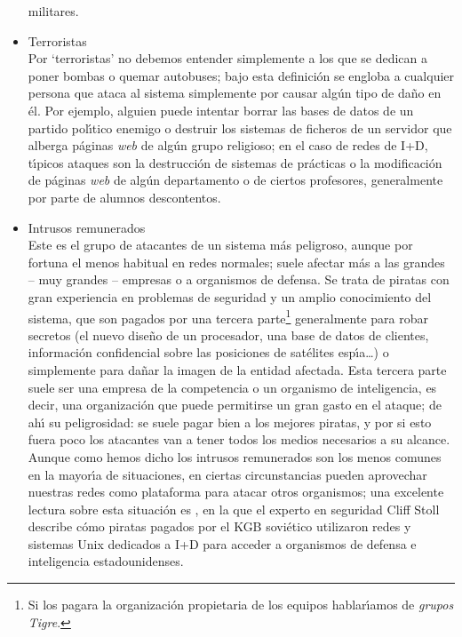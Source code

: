 \begin{itemize}
militares.
\item Terroristas\\
Por `terroristas' no debemos entender simplemente a los que se dedican a poner
bombas o quemar autobuses; bajo esta definici\'on se engloba a cualquier 
persona que ataca al sistema simplemente por causar alg\'un tipo de da\~no en 
\'el. Por ejemplo, alguien puede intentar borrar las bases de datos de un 
partido pol\'{\i}tico enemigo o destruir los sistemas de ficheros de un 
servidor que alberga p\'aginas {\it web} de alg\'un grupo religioso; en el caso
de redes de I+D, t\'{\i}picos ataques son la destrucci\'on de sistemas de 
pr\'acticas o la modificaci\'on de p\'aginas {\it web} de alg\'un departamento 
o de ciertos profesores, generalmente por parte de alumnos descontentos. 
\item Intrusos remunerados\\
Este es el grupo de atacantes de un sistema m\'as peligroso, aunque por fortuna
el menos ha\-bi\-tual en redes normales; suele afectar m\'as a las grandes 
-- muy grandes -- empresas o a organismos de defensa. Se trata de piratas con 
gran experiencia
en problemas de seguridad y un amplio conocimiento del sistema, que son pagados
por una tercera parte\footnote{Si los pagara la organizaci\'on propietaria de
los equipos hablar\'{\i}amos de {\it grupos Tigre}.} generalmente para robar 
secretos (el nuevo dise\~no de un procesador, una base de datos de clientes, 
informaci\'on confidencial sobre las posiciones de sat\'elites esp\'{\i}a\ldots)
o simplemente para da\~nar la imagen de la entidad afectada. Esta tercera parte 
suele 
ser una empresa de la competencia o un organismo de inteligencia, es decir,
una organizaci\'on que puede permitirse un gran gasto en el ataque; de ah\'{\i}
su peligrosidad: se suele pagar bien a los mejores piratas, y por si esto
fuera poco los atacantes van a tener todos los medios necesarios a su alcance.\\
Aunque como hemos dicho los intrusos remunerados son los menos comunes en 
la mayor\'{\i}a de situaciones, en ciertas circunstancias pueden aprovechar 
nuestras redes como plataforma para atacar otros organismos; una 
excelente lectura sobre esta situaci\'on es \cite{kn:sto89}, en la que el 
experto en seguridad Cliff Stoll describe c\'omo piratas pagados por el KGB 
sovi\'etico utilizaron redes y sistemas Unix dedicados a I+D para acceder a 
organismos de defensa e inteligencia estadounidenses.
\end{itemize}
